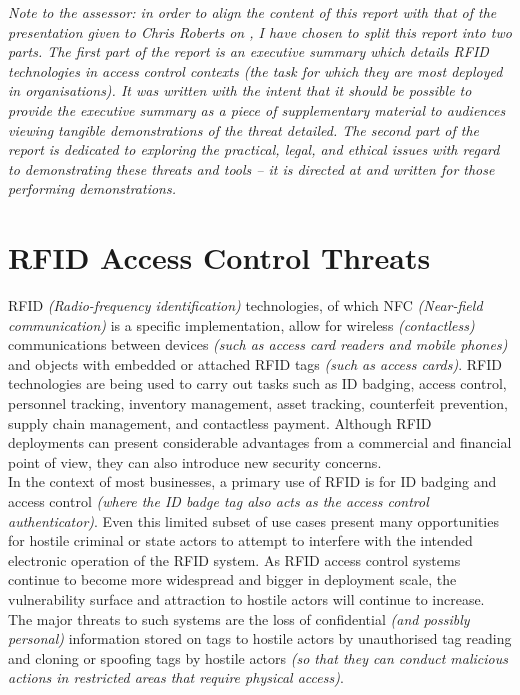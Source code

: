 \textit{Note to the assessor: in order to align the content of this report with that of the presentation given to Chris Roberts on , I have chosen to split this report into two parts. The first part of the report is an executive summary which details RFID technologies in access control contexts (the task for which they are most deployed in organisations). It was written with the intent that it should be possible to provide the executive summary as a piece of supplementary material to audiences viewing tangible demonstrations of the threat detailed. The second part of the report is dedicated to exploring the practical, legal, and ethical issues with regard to demonstrating these threats and tools -- it is directed at and written for those performing demonstrations.}

\section{RFID Access Control Threats}
RFID \textit{(Radio-frequency identification)} technologies, of which NFC \textit{(Near-field communication)} is a specific implementation, allow for wireless \textit{(contactless)} communications between devices \textit{(such as access card readers and mobile phones)} and objects with embedded or attached RFID tags \textit{(such as access cards)}. RFID technologies are being used to carry out tasks such as ID badging, access control, personnel tracking, inventory management, asset tracking, counterfeit prevention, supply chain management, and contactless payment. Although RFID deployments can present considerable advantages from a commercial and financial point of view, they can also introduce new security concerns.\\

\noindent In the context of most businesses, a primary use of RFID is for ID badging and access control \textit{(where the ID badge tag also acts as the access control authenticator)}. Even this limited subset of use cases present many opportunities for hostile criminal or state actors to attempt to interfere with the intended electronic operation of the RFID system. As RFID access control systems continue to become more widespread and bigger in deployment scale, the vulnerability surface and attraction to hostile actors will continue to increase.\\

\noindent The major threats to such systems are the loss of confidential \textit{(and possibly personal)} information stored on tags to hostile actors by unauthorised tag reading and cloning or spoofing tags by hostile actors \textit{(so that they can conduct malicious actions in restricted areas that require physical access)}.\\

